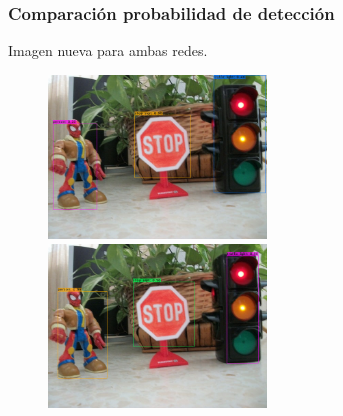 \documentclass{beamer}
\begin{document}
\begin{frame}
	\frametitle{Comparación probabilidad de detección}
	\begin{outline}
		\1 Imagen nueva para ambas redes.
	\end{outline}
	\begin{figure}
		\centering
		\includegraphics[width=5.8cm]{figs/predictionsoriginal}\hspace{0.1cm}
		\includegraphics[width=5.8cm]{figs/predictionscustom}
	\end{figure}
\end{frame}
\end{document}
